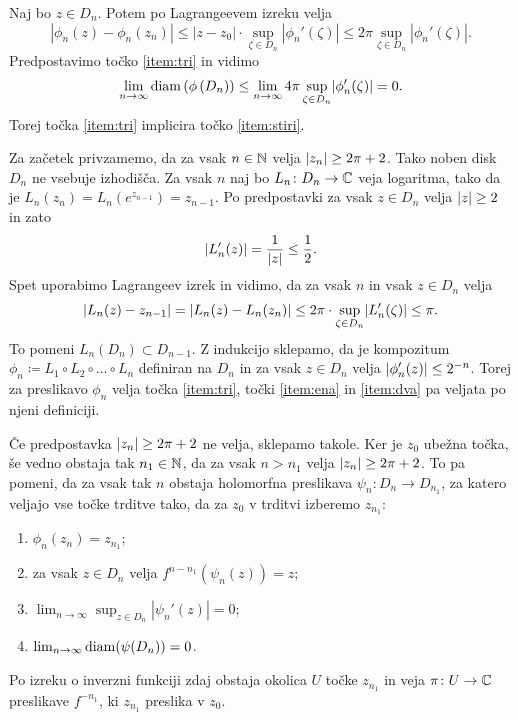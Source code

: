 \begin{dokaz}
    Naj bo \(z \in D_n\). Potem po Lagrangeevem izreku velja
    \begin{equation}
        |\phi_n (z) - \phi_n (z_n)| \leq |z - z_0| \cdot \sup_{\zeta \in D_n} |\phi_n' (\zeta)| \leq 2 \pi \sup_{\zeta \in D_n} |\phi_n' (\zeta)|.
    \end{equation}
    Predpostavimo točko \ref{item:tri} in vidimo
    \[\lim_{n \to \infty} \diam \prt{\phi \prt{D_n}} \leq \lim_{n \to \infty} 4 \pi \sup_{\zeta \in D_n} \abs{\phi_n' (\zeta)} = 0.\]
    Torej točka \ref{item:tri} implicira točko \ref{item:stiri}.

    Za začetek privzamemo, da za vsak \(n \in \mathbb N\) velja \(\lvert z_n\rvert \geq 2 \pi + 2\). Tako noben disk \(D_n\) ne vsebuje izhodišča. Za vsak \(n\) naj bo \(L_n \colon D_n \to \mathbb C\) veja logaritma, tako da je \(L_n (z_n) = L_n (e^{z_{n - 1}}) = z_{n - 1}\). Po predpostavki za vsak \(z \in D_n\) velja \(\lvert z\rvert \geq 2\) in zato
    \[\lvert L_n' (z)\rvert = \frac{1}{\lvert z\rvert} \leq \frac{1}{2}.\]
    Spet uporabimo Lagrangeev izrek in vidimo, da za vsak \(n\) in vsak \(z \in D_n\) velja
    \[\lvert L_n (z) - z_{n - 1}\rvert = \lvert L_n (z) - L_n (z_n)\rvert \leq 2 \pi \cdot \sup_{\zeta \in D_n} \lvert L_n' (\zeta)\rvert \leq \pi.\]
    To pomeni \(L_n (D_n) \subset D_{n - 1}\). Z indukcijo sklepamo, da je kompozitum \(\phi_n \coloneq L_1 \circ L_2 \circ \dots \circ L_n\) definiran na \(D_n\) in za vsak \(z \in D_n\) velja \(\lvert\phi_n' (z)\rvert \leq 2^{-n}\). Torej za preslikavo \(\phi_n\) velja točka \ref{item:tri}, točki \ref{item:ena} in \ref{item:dva} pa veljata po njeni definiciji.

    Če predpostavka \(\lvert z_n\rvert \geq 2 \pi + 2\) ne velja, sklepamo takole. Ker je \(z_0\) ubežna točka, še vedno obstaja tak \(n_1 \in \mathbb N\), da za vsak \(n > n_1\) velja \(\lvert z_n\rvert \geq 2 \pi + 2\). To pa pomeni, da za vsak tak \(n\) obstaja holomorfna preslikava \(\psi_n \colon D_n \to D_{n_1}\), za katero veljajo vse točke trditve tako, da za \(z_0\) v trditvi izberemo \(z_{n_1}\):
    \begin{enumerate}
        \item \(\phi_n (z_n) = z_{n_1}\);
        \item za vsak \(z \in D_n\) velja \(f^{n - n_1} (\psi_n (z)) = z\);
        \item \(\lim_{n \to \infty} \sup_{z \in D_n} |\psi_n' (z)| = 0\);
        \item \(\lim_{n \to \infty} \operatorname{diam} (\psi (D_n)) = 0\).
    \end{enumerate}
    Po izreku o inverzni funkciji zdaj obstaja okolica \(U\) točke \(z_{n_1}\) in veja \(\pi \colon U \to \mathbb C\) preslikave \(f^{- n_1}\), ki \(z_{n_1}\) preslika v \(z_0\).


\end{dokaz}

